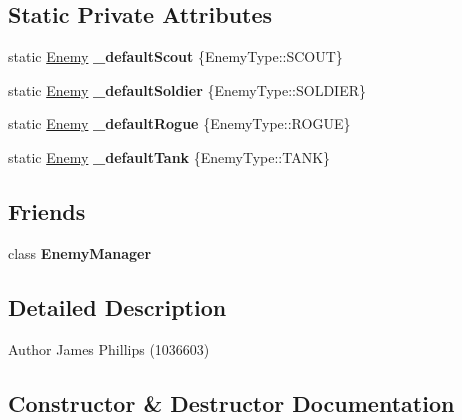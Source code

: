 \subsection*{Static Private Attributes}
\begin{DoxyCompactItemize}
\item 
\mbox{\label{class_enemy_a2fc8a9f17adf285b5e4de6313634be22}} 
static \hyperlink{class_enemy}{Enemy} {\bfseries \+\_\+default\+Scout} \{Enemy\+Type\+::\+S\+C\+O\+UT\}
\item 
\mbox{\label{class_enemy_ab8db9b04d15ed20f32c541b6a3fccecc}} 
static \hyperlink{class_enemy}{Enemy} {\bfseries \+\_\+default\+Soldier} \{Enemy\+Type\+::\+S\+O\+L\+D\+I\+ER\}
\item 
\mbox{\label{class_enemy_a678760b166085ad28d2568c80dde9c70}} 
static \hyperlink{class_enemy}{Enemy} {\bfseries \+\_\+default\+Rogue} \{Enemy\+Type\+::\+R\+O\+G\+UE\}
\item 
\mbox{\label{class_enemy_a27c1284d98b8009247f0a1347811876f}} 
static \hyperlink{class_enemy}{Enemy} {\bfseries \+\_\+default\+Tank} \{Enemy\+Type\+::\+T\+A\+NK\}
\end{DoxyCompactItemize}
\subsection*{Friends}
\begin{DoxyCompactItemize}
\item 
\mbox{\label{class_enemy_a316703164b8c295e193f235a3c275003}} 
class {\bfseries Enemy\+Manager}
\end{DoxyCompactItemize}


\subsection{Detailed Description}
\begin{DoxyAuthor}{Author}
James Phillips (1036603) 
\end{DoxyAuthor}


\subsection{Constructor \& Destructor Documentation}
\mbox{\label{class_enemy_aad76aec6e71a26cff30fd4bb1d5323d2}} 
